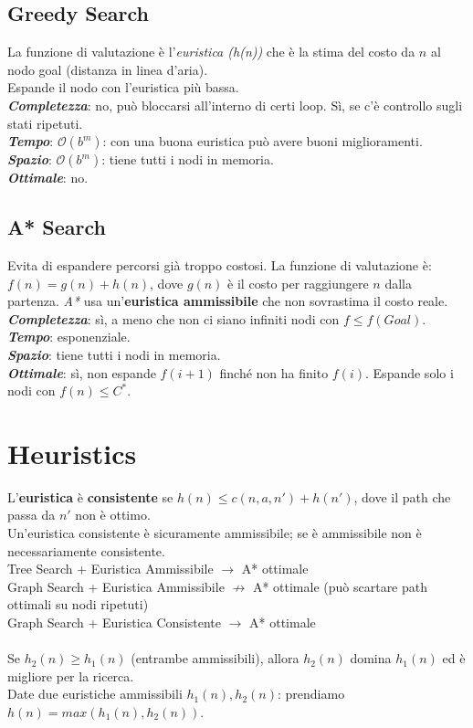 \documentclass[a4paper, notitlepage, 9pt]{extreport}
\begin{document}
\subsection*{Greedy Search}
La funzione di valutazione è l'\textit{euristica (h(n))} che è la stima del costo da $n$ al nodo goal (distanza in linea d'aria).\\
Espande il nodo con l'euristica più bassa.\\
\textit{\textbf{Completezza}}: no, può bloccarsi all'interno di certi loop. Sì, se c'è controllo sugli stati ripetuti.\\
\textit{\textbf{Tempo}}: $\mathcal{O}(b^m)$: con una buona euristica può avere buoni miglioramenti.\\
\textit{\textbf{Spazio}}: $\mathcal{O}(b^m)$: tiene tutti i nodi in memoria.\\
\textit{\textbf{Ottimale}}: no.


\subsection*{A* Search}
Evita di espandere percorsi già troppo costosi. La funzione di valutazione è: $f(n) = g(n) + h(n)$, dove $g(n)$ è il costo per raggiungere $n$ dalla partenza. \textit{A*} usa un'\textbf{euristica ammissibile} che non sovrastima il costo reale.\\
\textit{\textbf{Completezza}}: sì, a meno che non ci siano infiniti nodi con $f\leq f(Goal)$.\\
\textit{\textbf{Tempo}}: esponenziale.\\
\textit{\textbf{Spazio}}: tiene tutti i nodi in memoria.\\
\textit{\textbf{Ottimale}}: sì, non espande $f(i+1)$ finché non ha finito $f(i)$. Espande solo i nodi con $f(n)\leq C^*$.

\section*{Heuristics}
L'\textbf{euristica} è \textbf{consistente} se $h(n) \leq c(n, a, n') + h(n')$, dove il path che passa da $n'$ non è ottimo.\\
Un'euristica consistente è sicuramente ammissibile; se è ammissibile non è necessariamente consistente.\\
Tree Search + Euristica Ammissibile $\rightarrow$ A* ottimale\\
Graph Search + Euristica Ammissibile $\nrightarrow$ A* ottimale (può scartare path ottimali su nodi ripetuti)\\
Graph Search + Euristica Consistente $\rightarrow$ A* ottimale\\\\
Se $h_2(n) \geq h_1(n)$ (entrambe ammissibili), allora $h_2(n)$ domina $h_1(n)$ ed è migliore per la ricerca.\\
Date due euristiche ammissibili $h_1(n), h_2(n)$: prendiamo $h(n) = max (h_1(n), h_2(n))$.
\end{document}
